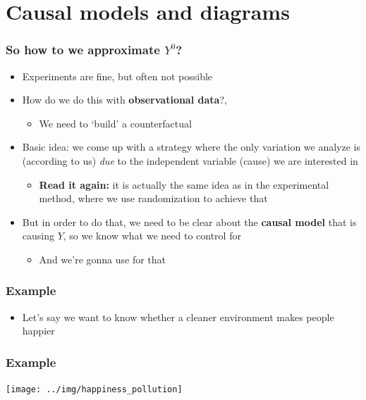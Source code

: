 \documentclass[aspectratio=43]{beamer}
\begin{document}
\section{Causal models and diagrams}

\begin{frame}
\frametitle{So how to we approximate $Y^{0}$?}
\centering

\begin{itemize}
  \item Experiments are fine, but often not possible
  \item<2-> How do we do this with \textbf{observational data}?,
    \begin{itemize}
      \item We need to `build' a counterfactual
    \end{itemize}
  \item<3-> Basic idea: we come up with a strategy where the only variation we analyze is (according to us) \textit{due} to the independent variable (cause) we are interested in
  \begin{itemize}
    \item \textbf{Read it again:} it is actually the same idea as in the experimental method, where we use randomization to achieve that
  \end{itemize}
  \item<4-> But in order to do that, we need to be clear about the \textbf{causal model} that is causing $Y$, so we know what we need to control for
  \begin{itemize}
    \item And we're gonna use  for that
  \end{itemize}
\end{itemize}

\end{frame}


\begin{frame}
\frametitle{Example}
\centering

\begin{itemize}
\item Let's say we want to know whether a cleaner environment makes people happier
\end{itemize}

\end{frame}

\begin{frame}
\frametitle{Example}
\centering

\texttt{[image: ../img/happiness\_pollution]}

\end{frame}
\end{document}
